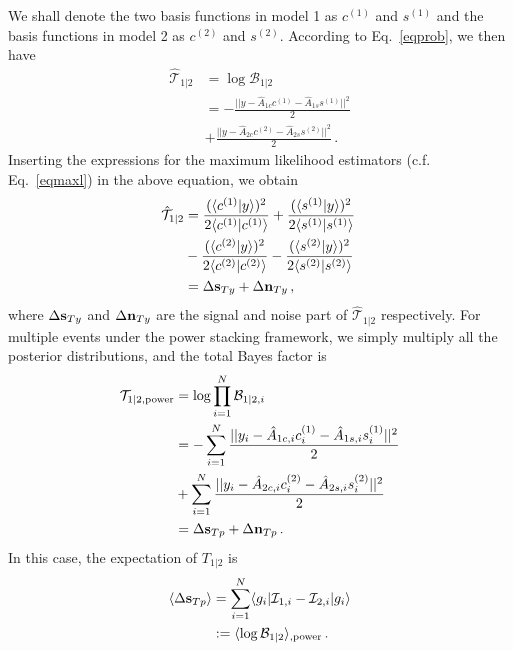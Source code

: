 \documentclass[prd,aps,floatfix,superscriptaddress,nofootinbib,twocolumn,10pt,English]{revtex4-1}
\begin{document}
We shall denote the two basis functions in model 1 as $c^{(1)}$ and
$s^{(1)}$ and the basis functions in model 2 as $c^{(2)}$ and
$s^{(2)}$. According to Eq.~\eqref{eqprob}, we then have
\begin{align}
\hat{\mathcal T}_{1 | 2} &= \log \mathcal B_{1|2} \nonumber \\
&=-\frac{|| y- \hat{A}_{1c} c^{(1)}-\hat{A}_{1s} s^{(1)}||^2}{2} \nonumber \\
&+\frac{|| y- \hat{A}_{2c} c^{(2)}-\hat{A}_{2s} s^{(2)}||^2}{2}\,.
\end{align}
%
Inserting the expressions for the maximum likelihood estimators
(c.f. Eq.~\eqref{eqmaxl}) in the above equation, we obtain 
\begin{align}
\hat{\mathcal T}_{1 | 2}  &=\frac{(\langle c^{(1)} | y \rangle)^2}{ 2\langle c^{(1)} | c^{(1)} \rangle}+\frac{(\langle s^{(1)} | y \rangle)^2}{ 2 \langle s^{(1)} | s^{(1)} \rangle}\, \nonumber \\
&-\frac{(\langle c^{(2)} | y \rangle)^2}{ 2\langle c^{(2)} | c^{(2)} \rangle}-\frac{(\langle s^{(2)} | y \rangle)^2}{ 2 \langle s^{(2)} | s^{(2)} \rangle}\, \nonumber \\
& =\Delta {\bf s}_{Ty} +\Delta {\bf n}_{Ty}\,,
\end{align}
where $\Delta {\bf s}_{Ty}$ and $\Delta {\bf n}_{Ty}$ are the signal and noise part of $\hat{\mathcal T}_{1 | 2}$ respectively.
For multiple events under the power stacking framework, we simply multiply all the posterior distributions, and the total Bayes factor is 
\begin{align}
\mathcal{T}_{1 | 2, {\rm power}} &= \log \prod^N_{i=1} \mathcal{B}_{1|2,i} \nonumber \\
&=-\sum^N_{i=1} \frac{|| y_i- \hat{A}_{1c,i} c_i^{(1)}-\hat{A}_{1s,i} s_i^{(1)}||^2}{2} \nonumber \\
&+\sum^N_{i=1} \frac{|| y_i- \hat{A}_{2c,i} c_i^{(2)}-\hat{A}_{2s,i} s_i^{(2)}||^2}{2}\nonumber \\
& =\Delta {\bf s}_{Tp} +\Delta {\bf n}_{Tp}\,.
\end{align}
In this case, the expectation of $T_{1 | 2}$ is 
\begin{align}
\label{eq:logB-power}
\langle \Delta {\bf s}_{Tp} \rangle  &= \sum^N_{i=1} \langle g_i | \mathcal{I}_{1,i} -\mathcal{I}_{2,i} | g_i \rangle \nonumber \\
&:= \langle \log \mathcal B_{1|2} \rangle_{,\mathrm{power}}\,.
\end{align}
\end{document}
